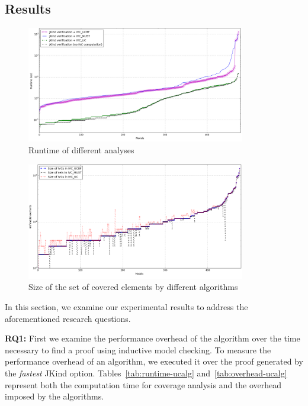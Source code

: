 \subsection{Results}
\label{sec:results}

\newcommand{\takeaway}[1]{
\vspace{6pt}
\noindent\fbox{\parbox{0.98\columnwidth}{#1}}
\vspace{6pt}
}

\begin{figure}
  \centering
  \includegraphics[width=0.85\textwidth]{figs/timing_analyses_all_sorted.png}
  \vspace{-0.1in}
  \caption{Runtime of different analyses}\label{fig:runtimeall}
\end{figure}

\begin{figure}
  \centering
  \includegraphics[width=0.85\textwidth]{figs/size.png}
  \vspace{-0.1in}
  \caption{Size of the set of covered elements by different algorithms}\label{fig:size}
\end{figure}

In this section, we examine our experimental results to address the aforementioned research questions.

\textbf{RQ1:} First we examine the performance overhead of the \ucalg algorithm over the time necessary to find a proof using inductive model checking. To measure the performance overhead of an algorithm, we executed it over the proof generated by the {\em fastest} JKind option. Tables~\ref{tab:runtime-ucalg}
and~\ref{tab:overhead-ucalg} represent both the
computation time for coverage analysis
and the overhead imposed by the algorithms.

